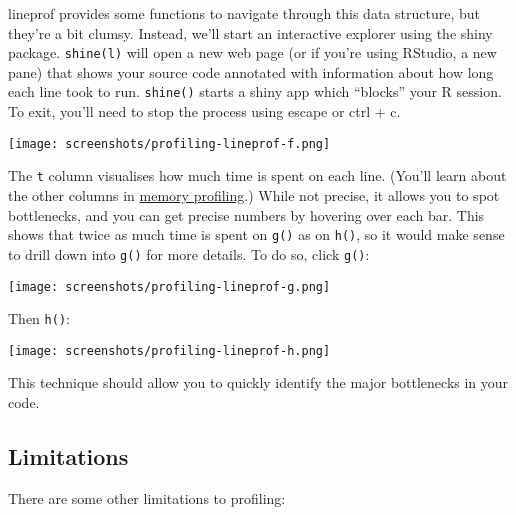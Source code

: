 \begin{Shaded}
\begin{Highlighting}[]
\NormalTok{(}\NormalTok{)}
\StringTok{ }\NormalTok{(}\NormalTok{())}
\end{Highlighting}
\end{Shaded}

lineprof provides some functions to navigate through this data
structure, but they're a bit clumsy. Instead, we'll start an interactive
explorer using the shiny package. \texttt{shine(l)} will open a new web
page (or if you're using RStudio, a new pane) that shows your source
code annotated with information about how long each line took to run.
\texttt{shine()} starts a shiny app which ``blocks'' your R session. To
exit, you'll need to stop the process using escape or ctrl + c.

\texttt{[image: screenshots/profiling-lineprof-f.png]}

The \texttt{t} column visualises how much time is spent on each line.
(You'll learn about the other columns in
\protect\hyperlink{memory-profiling}{memory profiling}.) While not
precise, it allows you to spot bottlenecks, and you can get precise
numbers by hovering over each bar. This shows that twice as much time is
spent on \texttt{g()} as on \texttt{h()}, so it would make sense to
drill down into \texttt{g()} for more details. To do so, click
\texttt{g()}:

\texttt{[image: screenshots/profiling-lineprof-g.png]}

Then \texttt{h()}:

\texttt{[image: screenshots/profiling-lineprof-h.png]}

This technique should allow you to quickly identify the major
bottlenecks in your code.

\hypertarget{limitations}{%
\subsection{Limitations}\label{limitations}}

There are some other limitations to profiling:

